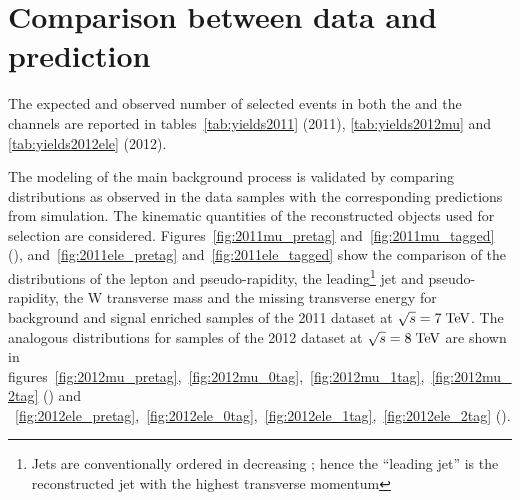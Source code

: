 \section{Comparison between data and prediction}
\label{sec:datamc}

The expected and observed number of selected events in both the \mujets{} and
the \ejets{} channels are reported in tables~\ref{tab:yields2011}
(2011), \ref{tab:yields2012mu} and \ref{tab:yields2012ele} (2012).



The modeling of the main background process is validated by comparing
distributions as observed in the data samples with the corresponding
predictions from simulation. The kinematic quantities of the reconstructed
objects used for selection are
considered. Figures~\ref{fig:2011mu_pretag}
and~\ref{fig:2011mu_tagged} (\mujets{}), and~\ref{fig:2011ele_pretag}
and~\ref{fig:2011ele_tagged} show the comparison of the distributions
of the lepton \pt{} and pseudo-rapidity, the leading\footnote{Jets are
conventionally ordered in decreasing \pt{}; hence the ``leading jet''
is the reconstructed jet with the highest transverse momentum} jet
\pt{} and pseudo-rapidity, the W transverse mass and the missing
transverse energy for background and signal enriched samples of the
2011 dataset at $\sqrt{s} = 7 \; \mathrm{TeV}{}$. The analogous distributions for
samples of the 2012 dataset at $\sqrt{s} = 8 \; \mathrm{TeV}{}$ are shown in
figures~\ref{fig:2012mu_pretag},~\ref{fig:2012mu_0tag},~\ref{fig:2012mu_1tag},~\ref{fig:2012mu_2tag}
(\mujets{}) and
~\ref{fig:2012ele_pretag},~\ref{fig:2012ele_0tag},~\ref{fig:2012ele_1tag},~\ref{fig:2012ele_2tag} (\ejets{}).


